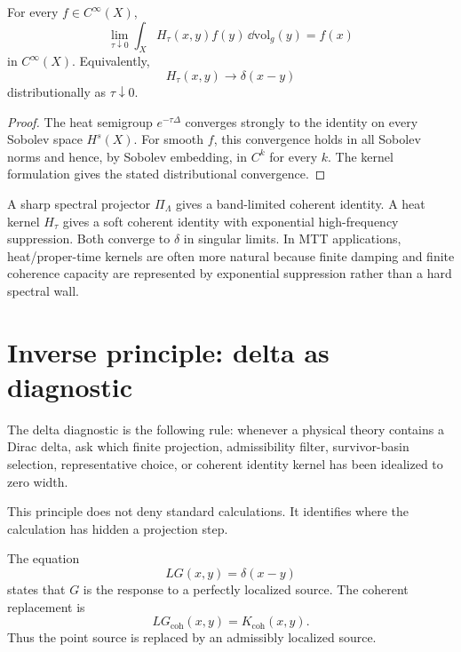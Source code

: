 \documentclass[11pt]{article}
\begin{document}
\begin{theorem}\label{thm:heat}
For every \(f\in C^\infty(X)\),
\begin{equation}
\lim_{\tau\downarrow 0}\int_X H_\tau(x,y)f(y)\,\dd\mathrm{vol}_g(y)=f(x)
\end{equation}
in \(C^\infty(X)\).  Equivalently,
\begin{equation}
H_\tau(x,y)\to \delta(x-y)
\end{equation}
distributionally as \(\tau\downarrow 0\).
\end{theorem}

\begin{proof}
The heat semigroup \(e^{-\tau\Delta}\) converges strongly to the identity on every Sobolev
space \(H^s(X)\).  For smooth \(f\), this convergence holds in all Sobolev norms and hence,
by Sobolev embedding, in \(C^k\) for every \(k\).  The kernel formulation gives the stated
distributional convergence.
\end{proof}

\begin{remark}
A sharp spectral projector \(\Pi_\Lambda\) gives a band-limited coherent identity.  A heat
kernel \(H_\tau\) gives a soft coherent identity with exponential high-frequency suppression.
Both converge to \(\delta\) in singular limits.  In MTT applications, heat/proper-time kernels
are often more natural because finite damping and finite coherence capacity are represented
by exponential suppression rather than a hard spectral wall.
\end{remark}

\section{Inverse principle: delta as diagnostic}

\begin{definition}\label{def:delta-diagnostic}
The delta diagnostic is the following rule: whenever a physical theory contains a Dirac
delta, ask which finite projection, admissibility filter, survivor-basin selection,
representative choice, or coherent identity kernel has been idealized to zero width.
\end{definition}

This principle does not deny standard calculations.  It identifies where the calculation has
hidden a projection step.

\begin{example}
The equation
\begin{equation}
LG(x,y)=\delta(x-y)
\end{equation}
states that \(G\) is the response to a perfectly localized source.  The coherent replacement is
\begin{equation}
LG_{\mathrm{coh}}(x,y)=K_{\mathrm{coh}}(x,y).
\end{equation}
Thus the point source is replaced by an admissibly localized source.
\end{example}
\end{document}
